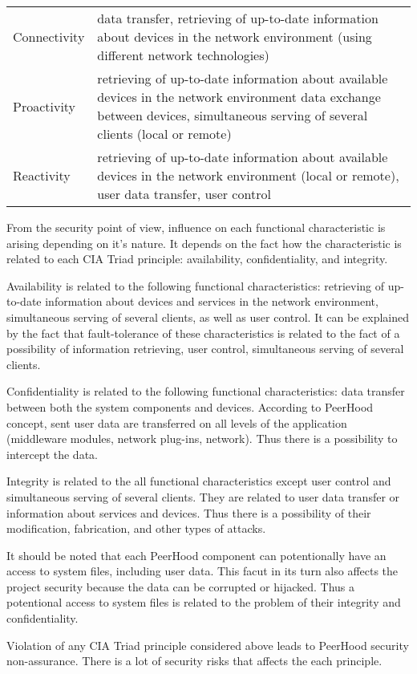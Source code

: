  {
	\begin{tabular}{ | p{4cm} | p{10cm} | }
	  \hline                       
	  \Bold{Goal} & \Bold{Characteristics} \\ \hline
	  Connectivity & data transfer, retrieving of up-to-date information about devices in the network environment (using different network technologies) \\ \hline
	  Proactivity & retrieving of up-to-date information about available devices in the network environment data exchange between devices,  simultaneous serving of several clients (local or remote) \\ \hline
	  Reactivity & retrieving of up-to-date information about available devices in the network environment (local or remote), user data transfer, user control \\ \hline
	\end{tabular}
}

%
From the security point of view, influence on each functional characteristic is arising depending on it's nature. 
%
It depends on the fact how the characteristic is related to each CIA Triad principle: availability, confidentiality, and integrity. 

%
Availability is related to the following functional characteristics: retrieving of up-to-date information about devices and services in the network environment, simultaneous serving of several clients, as well as user control. 
%
It can be explained by the fact that fault-tolerance of these characteristics is related to the fact of a possibility of information retrieving, user control, simultaneous serving of several clients. 

%
Confidentiality is related to the following functional characteristics: data transfer between both the system components and devices. 
%
According to PeerHood concept, sent user data are transferred on all levels of the application (middleware modules, network plug-ins, network). 
%
Thus there is a possibility to intercept the data. 

%
Integrity is related to the all functional characteristics except user control and simultaneous serving of several clients. 
%
They are related to user data transfer or information about services and devices. 
%
Thus there is a possibility of their modification, fabrication, and other types of attacks. 

%
It should be noted that each PeerHood component can potentionally have an access to system files, including user data. 
%
This facut in its turn also affects the project security because the data can be corrupted or hijacked. 
%
Thus a potentional access to system files is related to the problem of their integrity and confidentiality. 

%
Violation of any CIA Triad principle considered above leads to PeerHood security non-assurance. 
%
There is a lot of security risks that affects the each principle. 